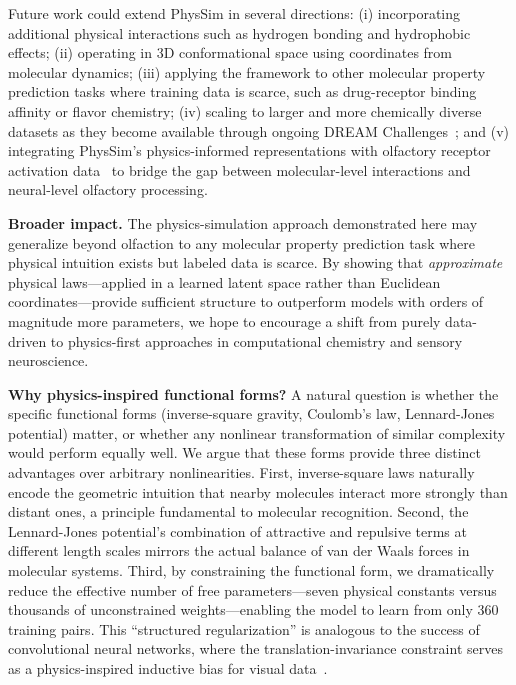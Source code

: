 \documentclass[11pt,a4paper]{article}
\begin{document}
Future work could extend PhysSim in several directions: (i) incorporating additional physical interactions such as hydrogen bonding and hydrophobic effects; (ii) operating in 3D conformational space using coordinates from molecular dynamics; (iii) applying the framework to other molecular property prediction tasks where training data is scarce, such as drug-receptor binding affinity or flavor chemistry; (iv) scaling to larger and more chemically diverse datasets as they become available through ongoing DREAM Challenges~\cite{dream2025}; and (v) integrating PhysSim's physics-informed representations with olfactory receptor activation data~\cite{saito2009} to bridge the gap between molecular-level interactions and neural-level olfactory processing.

\textbf{Broader impact.} The physics-simulation approach demonstrated here may generalize beyond olfaction to any molecular property prediction task where physical intuition exists but labeled data is scarce. By showing that \emph{approximate} physical laws---applied in a learned latent space rather than Euclidean coordinates---provide sufficient structure to outperform models with orders of magnitude more parameters, we hope to encourage a shift from purely data-driven to physics-first approaches in computational chemistry and sensory neuroscience.

\textbf{Why physics-inspired functional forms?} A natural question is whether the specific functional forms (inverse-square gravity, Coulomb's law, Lennard-Jones potential) matter, or whether any nonlinear transformation of similar complexity would perform equally well. We argue that these forms provide three distinct advantages over arbitrary nonlinearities. First, inverse-square laws naturally encode the geometric intuition that nearby molecules interact more strongly than distant ones, a principle fundamental to molecular recognition. Second, the Lennard-Jones potential's combination of attractive and repulsive terms at different length scales mirrors the actual balance of van der Waals forces in molecular systems. Third, by constraining the functional form, we dramatically reduce the effective number of free parameters---seven physical constants versus thousands of unconstrained weights---enabling the model to learn from only 360 training pairs. This ``structured regularization'' is analogous to the success of convolutional neural networks, where the translation-invariance constraint serves as a physics-inspired inductive bias for visual data~\cite{karniadakis2021}.
\end{document}
